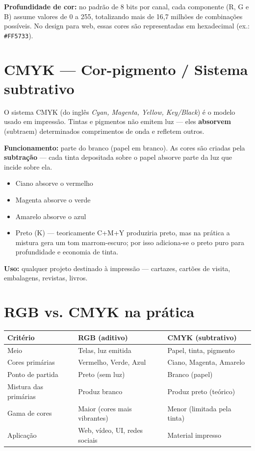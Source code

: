 \documentclass[a4paper,12pt]{article}
\begin{document}
\medskip
\noindent \textbf{Profundidade de cor:} no padrão de 8 bits por canal, cada componente (R, G e B) assume valores de 0 a 255, totalizando mais de 16,7 milhões de combinações possíveis. No design para web, essas cores são representadas em hexadecimal (ex.: \texttt{\#FF5733}).

\section{CMYK --- Cor-pigmento / Sistema subtrativo}

O sistema CMYK (do inglês \textit{Cyan, Magenta, Yellow, Key/Black}) é o modelo usado em impressão. Tintas e pigmentos não emitem luz --- eles \textbf{absorvem} (subtraem) determinados comprimentos de onda e refletem outros.

\bigskip
\noindent \textbf{Funcionamento:} parte do branco (papel em branco). As cores são criadas pela \textbf{subtração} --- cada tinta depositada sobre o papel absorve parte da luz que incide sobre ela.

\begin{itemize}[nosep]
  \item Ciano absorve o vermelho
  \item Magenta absorve o verde
  \item Amarelo absorve o azul
  \item Preto (K) --- teoricamente C+M+Y produziria preto, mas na prática a mistura gera um tom marrom-escuro; por isso adiciona-se o preto puro para profundidade e economia de tinta.
\end{itemize}

\medskip
\noindent \textbf{Uso:} qualquer projeto destinado à impressão --- cartazes, cartões de visita, embalagens, revistas, livros.

\section{RGB vs. CMYK na prática}

\begin{center}
\begin{tabular}{|p{}|p{}|p{}|}
\hline
\textbf{Critério} & \textbf{RGB (aditivo)} & \textbf{CMYK (subtrativo)} \\
\hline
Meio & Telas, luz emitida & Papel, tinta, pigmento \\
\hline
Cores primárias & Vermelho, Verde, Azul & Ciano, Magenta, Amarelo \\
\hline
Ponto de partida & Preto (sem luz) & Branco (papel) \\
\hline
Mistura das primárias & Produz branco & Produz preto (teórico) \\
\hline
Gama de cores & Maior (cores mais vibrantes) & Menor (limitada pela tinta) \\
\hline
Aplicação & Web, vídeo, UI, redes sociais & Material impresso \\
\hline
\end{tabular}
\end{center}
\end{document}
